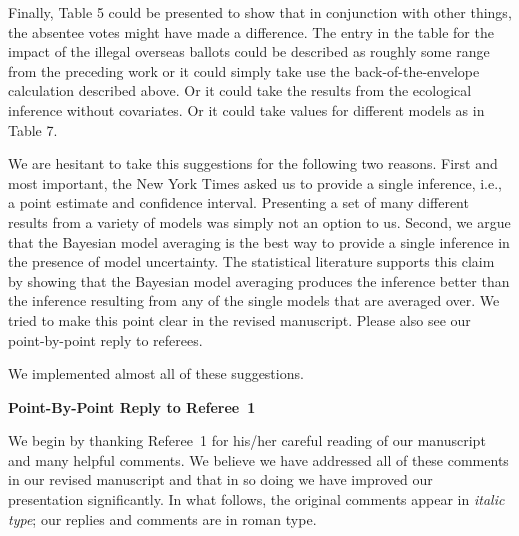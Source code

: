 \documentclass[11pt]{article}
\begin{document}
\begin{enumerate}
{    Finally, Table 5 could be presented to show that in conjunction
    with other things, the absentee votes might have made a
    difference.  The entry in the table for the impact of the illegal
    overseas ballots could be described as roughly some range from the
    preceding work or it could simply take use the
    back-of-the-envelope calculation described above.  Or it could
    take the results from the ecological inference without covariates.
    Or it could take values for different models as in Table 7.}
  
  We are hesitant to take this suggestions for the following two
  reasons. First and most important, the New York Times asked us to
  provide a single inference, i.e., a point estimate and confidence
  interval. Presenting a set of many different results from a variety
  of models was simply not an option to us. Second, we argue that the
  Bayesian model averaging is the best way to provide a single
  inference in the presence of model uncertainty. The statistical
  literature supports this claim by showing that the Bayesian model
  averaging produces the inference better than the inference resulting
  from any of the single models that are averaged over. We tried to
  make this point clear in the revised manuscript. Please also see our
  point-by-point reply to referees.

\end{enumerate}

\bigskip
{}

We implemented almost all of these suggestions.



\clearpage
\begin{center}
  {\bf \Large Point-By-Point Reply to Referee~1}
\end{center}

We begin by thanking Referee~1 for his/her careful reading of our
manuscript and many helpful comments. We believe we have addressed all
of these comments in our revised manuscript and that in so doing we
have improved our presentation significantly.  In what follows, the
original comments appear in \emph{italic type}; our replies and
comments are in roman type.

\bigskip
{}
\end{document}
